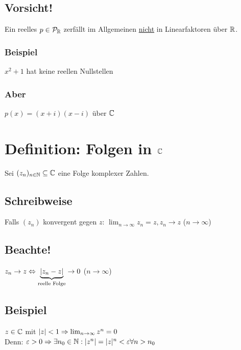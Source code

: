 \subsection*{Vorsicht!}
Ein reelles $p \in \mathcal{P}_{\mathbb{R}}$ zerfällt im Allgemeinen \underline{nicht} in Linearfaktoren über $\mathbb{R}$.

\subsubsection*{Beispiel}
$x^2+1$ hat keine reellen Nullstellen

\subsubsection*{Aber}
$p(x)=(x+i)(x-i)$ über $\mathbb{C}$

\newpage

\section{\texorpdfstring{Definition: Folgen in $\mathbb{C}$}{Definition: Folgen in \C}}\label{6.15}
Sei $(z_n)_{n \in \mathbb{N}} \subseteq \mathbb{C}$ eine Folge komplexer Zahlen.

\subsection*{Schreibweise}
Falls $(z_n)$ konvergent gegen $z$: $\lim_{n \to \infty} z_n = z, z_n \to z$ ($n \to \infty$)

\subsection*{Beachte!}
$z_n \to z \Leftrightarrow \underbrace{|z_n-z|}_{\text{reelle Folge}} \to 0$ ($n \to \infty$)

\subsection*{Beispiel}
$z \in \mathbb{C}$ mit $|z| < 1 \Rightarrow \lim_{n \to \infty} z^n = 0$\\
Denn: $\varepsilon > 0 \Rightarrow \exists n_0 \in \mathbb{N}: |z^n|=|z|^n < \varepsilon \forall n > n_0$

